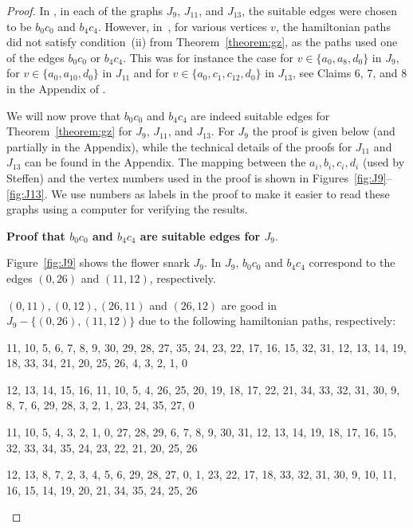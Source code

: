 \documentclass{amcjoucc}
\begin{document}
\begin{proof} In \cite{St01}, in each of the graphs $J_9$, $J_{11}$, and $J_{13}$, the suitable edges were chosen to be $b_0c_0$ and $b_4c_4$. However, in~\cite{St01}, for various vertices $v$, the hamiltonian paths did not satisfy condition~(ii) from Theorem~\ref{theorem:gz}, as the paths used one of the edges $b_0c_0$ or $b_4c_4$. This was for instance the case for $v \in \{a_0,a_8,d_0\}$ in $J_9$, for $v \in \{a_0,a_{10},d_0\}$ in $J_{11}$ and for $v \in \{a_0,c_1,c_{12},d_0\}$ in $J_{13}$, see Claims 6, 7, and 8 in the Appendix of \cite{St01}.

We will now prove that $b_0c_0$ and $b_4c_4$ are indeed suitable edges for Theorem~\ref{theorem:gz} for $J_9$, $J_{11}$, and $J_{13}$. For $J_9$ the proof is given below (and partially in the Appendix), while the technical details of the proofs for $J_{11}$ and $J_{13}$ can be found in the Appendix. The mapping between the $a_i,b_i,c_i,d_i$ (used by Steffen) and the vertex numbers used in the proof is shown in Figures~\ref{fig:J9}--\ref{fig:J13}. We use numbers as labels in the proof to make it easier to read these graphs using a computer for verifying the results.

\medskip

\noindent
\textbf{Proof that $b_0c_0$ and $b_4c_4$ are suitable edges for $J_9$}.

Figure~\ref{fig:J9} shows the flower snark $J_9$. In $J_9$, $b_0c_0$ and $b_4c_4$ correspond to the edges $(0,26)$ and $(11, 12)$, respectively.


$(0,11), (0,12), (26,11)$ and $(26,12)$ are good in $J_9 - \{(0,26),(11,12)\}$ due to the following hamiltonian paths, respectively:


\begin{itemize}
{\small
\item 11, 10, 5, 6, 7, 8, 9, 30, 29, 28, 27, 35, 24, 23, 22, 17, 16, 15, 32, 31, 12, 13, 14, 19, 18, 33, 34, 21, 20, 25, 26, 4, 3, 2, 1, 0
\item 12, 13, 14, 15, 16, 11, 10, 5, 4, 26, 25, 20, 19, 18, 17, 22, 21, 34, 33, 32, 31, 30, 9, 8, 7, 6, 29, 28, 3, 2, 1, 23, 24, 35, 27, 0
\item 11, 10, 5, 4, 3, 2, 1, 0, 27, 28, 29, 6, 7, 8, 9, 30, 31, 12, 13, 14, 19, 18, 17, 16, 15, 32, 33, 34, 35, 24, 23, 22, 21, 20, 25, 26
\item 12, 13, 8, 7, 2, 3, 4, 5, 6, 29, 28, 27, 0, 1, 23, 22, 17, 18, 33, 32, 31, 30, 9, 10, 11, 16, 15, 14, 19, 20, 21, 34, 35, 24, 25, 26}
\end{itemize}


\end{proof}
\end{document}
